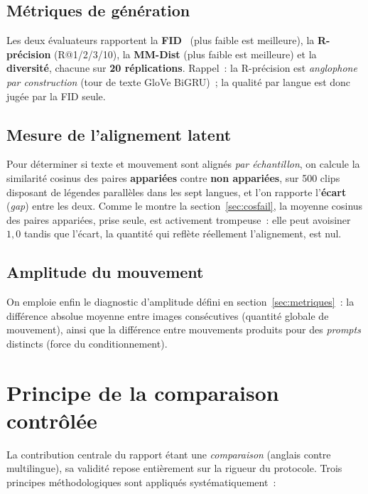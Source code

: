 \documentclass[12pt,a4paper,oneside]{report}
\theoremstyle{definition}
\theoremstyle{plain}
\begin{document}
\subsection{Métriques de génération}
Les deux évaluateurs rapportent la \textbf{FID}~\cite{heusel2017fid} (plus faible
est meilleure), la \textbf{R-précision} (R@1/2/3/10), la \textbf{MM-Dist} (plus
faible est meilleure) et la \textbf{diversité}, chacune sur \textbf{20
réplications}. Rappel~: la R-précision est \emph{anglophone par construction} (tour
de texte GloVe BiGRU)~; la qualité par langue est donc jugée par la FID seule.

\subsection{Mesure de l'alignement latent}
\label{sec:alignmetric}
Pour déterminer si texte et mouvement sont alignés \emph{par échantillon}, on
calcule la similarité cosinus des paires \textbf{appariées} contre
\textbf{non appariées}, sur 500 clips disposant de légendes parallèles dans les
sept langues, et l'on rapporte l'\textbf{écart} (\emph{gap}) entre les deux. Comme
le montre la section~\ref{sec:cosfail}, la moyenne cosinus des paires appariées,
prise seule, est activement trompeuse~: elle peut avoisiner $1{,}0$ tandis que
l'écart, la quantité qui reflète réellement l'alignement, est nul.

\subsection{Amplitude du mouvement}
On emploie enfin le diagnostic d'amplitude défini en
section~\ref{sec:metriques}~: la différence absolue moyenne entre images
consécutives (quantité globale de mouvement), ainsi que la différence entre
mouvements produits pour des \emph{prompts} distincts (force du conditionnement).

\section{Principe de la comparaison contrôlée}
\label{sec:methodo}

La contribution centrale du rapport étant une \emph{comparaison} (anglais contre
multilingue), sa validité repose entièrement sur la rigueur du protocole. Trois
principes méthodologiques sont appliqués systématiquement~:
\end{document}
